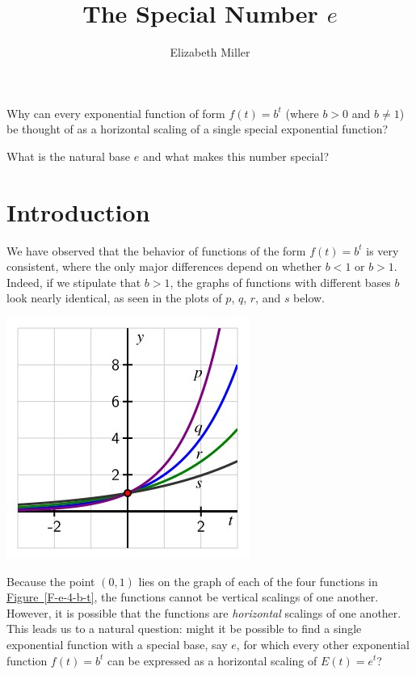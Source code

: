 \documentclass[nooutcomes]{ximera}
\author{Elizabeth Miller}
\title{The Special Number $e$}
\begin{document}
\begin{abstract}
  
\end{abstract}
\maketitle



\begin{motivatingQuestions}
\item Why can every exponential function of form \(f(t) = b^t\) (where \(b \gt 0\) and \(b \ne 1\)) be thought of as a horizontal scaling of a single special exponential function?
\item What is the natural base \(e\) and what makes this number special?
\end{motivatingQuestions}



\section{Introduction}
We have observed that the behavior of functions of the form \(f(t) = b^t\) is very consistent, where the only major differences depend on whether \(b \lt 1\) or \(b \gt 1\).  Indeed, if we stipulate that \(b \gt 1\), the graphs of functions with different bases \(b\) look nearly identical, as seen in the plots of \(p\), \(q\), \(r\), and \(s\) below.

\begin{image}
\includegraphics{ExpText12}
\end{image}
Because the point \((0,1)\) lies on the graph of each of the four functions in \hyperref[F-e-4-b-t]{Figure~\ref{F-e-4-b-t}}, the functions cannot be vertical scalings of one another.  However, it is possible that the functions are \emph{horizontal} scalings of one another.  This leads us to a natural question:  might it be possible to find a single exponential function with a special base, say \(e\), for which every other exponential function \(f(t) = b^t\) can be expressed as a horizontal scaling of \(E(t) = e^t\)?
\end{document}

